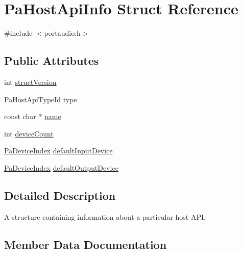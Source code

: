 \hypertarget{struct_pa_host_api_info}{}\section{Pa\+Host\+Api\+Info Struct Reference}
\label{struct_pa_host_api_info}


{\ttfamily \#include $<$portaudio.\+h$>$}

\subsection*{Public Attributes}
\begin{DoxyCompactItemize}
\item 
int \hyperlink{struct_pa_host_api_info_a1f3a8c465488e7af8024237256d80c14}{struct\+Version}
\item 
\hyperlink{portaudio_8h_a8eaebe3d39c5ea45598da8f86dc2e5ae}{Pa\+Host\+Api\+Type\+Id} \hyperlink{struct_pa_host_api_info_a5424bfcdf9f73b17cddc89e827a45d3f}{type}
\item 
const char $\ast$ \hyperlink{struct_pa_host_api_info_a78afe5d557543c82cd9773229e25a8ec}{name}
\item 
int \hyperlink{struct_pa_host_api_info_a44e3adfaba0117a6780e2493468c96b1}{device\+Count}
\item 
\hyperlink{portaudio_8h_ad79317e65bde63d76c4b8e711ac5a361}{Pa\+Device\+Index} \hyperlink{struct_pa_host_api_info_a85a62057c3479d3efaa477d8562cf21d}{default\+Input\+Device}
\item 
\hyperlink{portaudio_8h_ad79317e65bde63d76c4b8e711ac5a361}{Pa\+Device\+Index} \hyperlink{struct_pa_host_api_info_a62632690b5f7906d3c9bfdab91e7f4b2}{default\+Output\+Device}
\end{DoxyCompactItemize}


\subsection{Detailed Description}
A structure containing information about a particular host A\+PI. 

\subsection{Member Data Documentation}
\mbox{\label{struct_pa_host_api_info_a85a62057c3479d3efaa477d8562cf21d}} 
